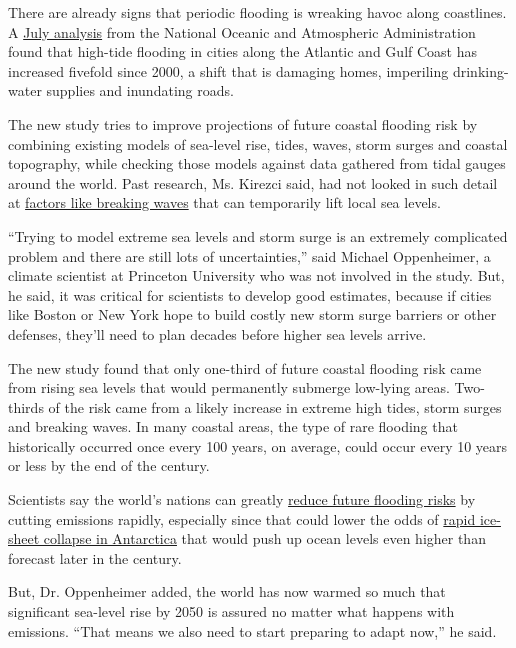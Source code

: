 There are already signs that periodic flooding is wreaking havoc along
coastlines. A
\href{https://www.nytimes3xbfgragh.onion/2020/07/14/climate/coastal-flooding-noaa.html}{July
analysis} from the National Oceanic and Atmospheric Administration found
that high-tide flooding in cities along the Atlantic and Gulf Coast has
increased fivefold since 2000, a shift that is damaging homes,
imperiling drinking-water supplies and inundating roads.

The new study tries to improve projections of future coastal flooding
risk by combining existing models of sea-level rise, tides, waves, storm
surges and coastal topography, while checking those models against data
gathered from tidal gauges around the world. Past research, Ms. Kirezci
said, had not looked in such detail at
\href{http://glossary.ametsoc.org/wiki/Wave_set-up/set-down}{factors
like breaking waves} that can temporarily lift local sea levels.

``Trying to model extreme sea levels and storm surge is an extremely
complicated problem and there are still lots of uncertainties,'' said
Michael Oppenheimer, a climate scientist at Princeton University who was
not involved in the study. But, he said, it was critical for scientists
to develop good estimates, because if cities like Boston or New York
hope to build costly new storm surge barriers or other defenses, they'll
need to plan decades before higher sea levels arrive.

The new study found that only one-third of future coastal flooding risk
came from rising sea levels that would permanently submerge low-lying
areas. Two-thirds of the risk came from a likely increase in extreme
high tides, storm surges and breaking waves. In many coastal areas, the
type of rare flooding that historically occurred once every 100 years,
on average, could occur every 10 years or less by the end of the
century.

Scientists say the world's nations can greatly
\href{https://www.nytimes3xbfgragh.onion/2019/09/25/climate/climate-change-oceans-united-nations.html}{reduce
future flooding risks} by cutting emissions rapidly, especially since
that could lower the odds of
\href{https://www.nytimes3xbfgragh.onion/interactive/2017/05/18/climate/antarctica-ice-melt-climate-change.html}{rapid
ice-sheet collapse in Antarctica} that would push up ocean levels even
higher than forecast later in the century.

But, Dr. Oppenheimer added, the world has now warmed so much that
significant sea-level rise by 2050 is assured no matter what happens
with emissions. ``That means we also need to start preparing to adapt
now,'' he said.

